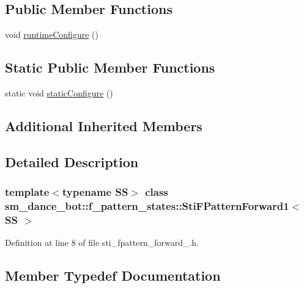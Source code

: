 \subsection*{Public Member Functions}
\begin{DoxyCompactItemize}
\item 
void \hyperlink{structsm__dance__bot_1_1f__pattern__states_1_1StiFPatternForward1_a9e03709a2f30692302b1e2bda6f369f2}{runtime\+Configure} ()
\end{DoxyCompactItemize}
\subsection*{Static Public Member Functions}
\begin{DoxyCompactItemize}
\item 
static void \hyperlink{structsm__dance__bot_1_1f__pattern__states_1_1StiFPatternForward1_a2a72e67d72c63c164fb976986570706b}{static\+Configure} ()
\end{DoxyCompactItemize}
\subsection*{Additional Inherited Members}


\subsection{Detailed Description}
\subsubsection*{template$<$typename SS$>$\newline
class sm\+\_\+dance\+\_\+bot\+::f\+\_\+pattern\+\_\+states\+::\+Sti\+F\+Pattern\+Forward1$<$ S\+S $>$}



Definition at line 8 of file sti\+\_\+fpattern\+\_\+forward\+\_.\+h.



\subsection{Member Typedef Documentation}
\mbox{\label{structsm__dance__bot_1_1f__pattern__states_1_1StiFPatternForward1_a17e681abc29409eb4d79ac3d75e91ddf}} 
